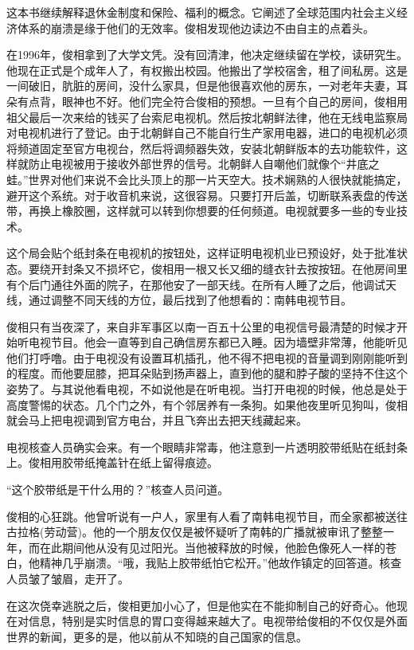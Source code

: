 这本书继续解释退休金制度和保险、福利的概念。它阐述了全球范围内社会主义经济体系的崩溃是缘于他们的无效率。俊相发现他边读边不由自主的点着头。

在1996年，俊相拿到了大学文凭。没有回清津，他决定继续留在学校，读研究生。他现在正式是个成年人了，有权搬出校园。他搬出了学校宿舍，租了间私房。这是一间破旧，肮脏的房间，没什么家具，但是他很喜欢他的房东，一对老年夫妻，耳朵有点背，眼神也不好。他们完全符合俊相的预想。一旦有个自己的房间，俊相用祖父最后一次来给的钱买了台索尼电视机。然后按北朝鲜法律，他在无线电监察局对电视机进行了登记。由于北朝鲜自己不能自行生产家用电器，进口的电视机必须将频道固定至官方电视台，然后将调频器失效，安装北朝鲜版本的去功能软件，这样就防止电视被用于接收外部世界的信号。北朝鲜人自嘲他们就像个“井底之蛙。”世界对他们来说不会比头顶上的那一片天空大。技术娴熟的人很快就能搞定，避开这个系统。对于收音机来说，这很容易。只要打开后盖，切断联系表盘的传送带，再换上橡胶圈，这样就可以转到你想要的任何频道。电视就要多一些的专业技术。

这个局会贴个纸封条在电视机的按钮处，这样证明电视机业已预设好，处于批准状态。要绕开封条又不损坏它，俊相用一根又长又细的缝衣针去按按钮。在他房间里有个后门通往外面的院子，在那他安了一部天线。在所有人睡了之后，他调试天线，通过调整不同天线的方位，最后找到了他想看的：南韩电视节目。

俊相只有当夜深了，来自非军事区以南一百五十公里的电视信号最清楚的时候才开始听电视节目。他会一直等到自己确信房东都已入睡。因为墙壁非常薄，他能听见他们打呼噜。由于电视没有设置耳机插孔，他不得不把电视的音量调到刚刚能听到的程度。而他要屈膝，把耳朵贴到扬声器上，直到他的腿和脖子酸的坚持不住这个姿势了。与其说他看电视，不如说他是在听电视。当打开电视的时候，他总是处于高度警惕的状态。几个门之外，有个邻居养有一条狗。如果他夜里听见狗叫，俊相就会马上把电视调到官方电台，并且飞奔出去把天线藏起来。

电视核查人员确实会来。有一个眼睛非常毒，他注意到一片透明胶带纸贴在纸封条上。俊相用胶带纸掩盖针在纸上留得痕迹。

“这个胶带纸是干什么用的？”核查人员问道。

俊相的心狂跳。他曾听说有一户人，家里有人看了南韩电视节目，而全家都被送往古拉格(劳动营)。他的一个朋友仅仅是被怀疑听了南韩的广播就被审讯了整整一年，而在此期间他从没有见过阳光。当他被释放的时候，他脸色像死人一样的苍白，他精神几乎崩溃。“哦，我贴上胶带纸怕它松开。”他故作镇定的回答道。核查人员皱了皱眉，走开了。

在这次侥幸逃脱之后，俊相更加小心了，但是他实在不能抑制自己的好奇心。他现在对信息，特别是实时信息的胃口变得越来越大了。电视带给俊相的不仅仅是外面世界的新闻，更多的是，他以前从不知晓的自己国家的信息。

